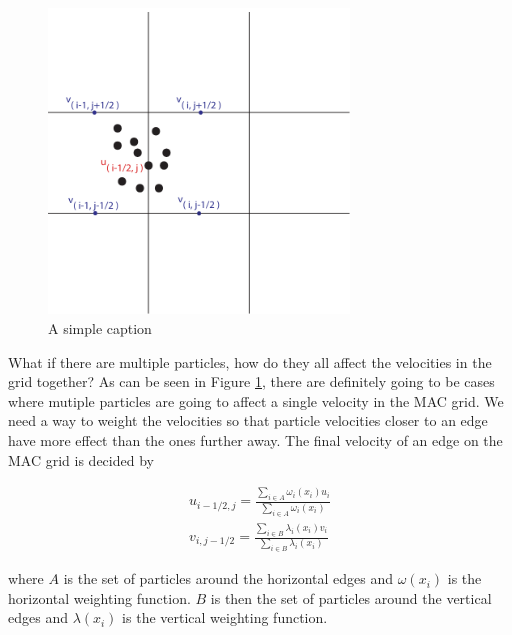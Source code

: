 \begin{figure}[ht!]
\centering
\includegraphics[width=80mm]{img/transfer2.pdf}
\caption{A simple caption}
\label{fouredge}
\end{figure}

What if there are multiple particles, how do they all affect the velocities in the grid together? As can be seen in Figure \ref{fouredge}, there are definitely going to be cases where mutiple particles are going to affect a single velocity in the MAC grid. We need a way to weight the velocities so that particle velocities closer to an edge have more effect than the ones further away. The final velocity of an edge on the MAC grid is decided by

\begin{eqnarray}
u_{i-1/2,j} = \frac{\sum\limits_{i\in A}\omega_i(x_i) u_{i}}{\sum\limits_{i \in A}\omega_i(x_i)} \\
v_{i,j-1/2} = \frac{ \sum\limits_{i \in B}\lambda_i(x_i) v_{i}}{\sum\limits_{i \in B}\lambda_i(x_i)}
\label{weightsums}
\end{eqnarray}

where $A$ is the set of particles around the horizontal edges and $\omega(x_i)$ is the horizontal weighting function. $B$ is then the set of particles around the vertical edges and $\lambda(x_i)$ is the vertical weighting function.

